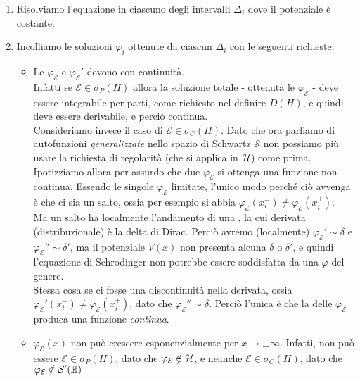\documentclass[../../FisicaTeorica.tex]{subfiles}
\begin{document}
\begin{enumerate}
\item Risolviamo l'equazione in ciascuno degli intervalli $\Delta_i$ dove il potenziale è costante.
\item Incolliamo le soluzioni $\varphi_i$ ottenute da ciascun $\Delta_i$ con le seguenti richieste:
\begin{itemize}
\item Le $\varphi_\mathcal{E}$ e $\varphi_{\mathcal{E}}'$ devono  con continuità.\\ Infatti se $\mathcal{E}\in \sigma_P(H)$ allora la soluzione totale - ottenuta  le $\varphi_\mathcal{E}$ - deve essere 
integrabile per parti, come richiesto nel definire $D(H)$, e quindi deve essere derivabile, e perciò continua.\\
Consideriamo invece il caso di $\mathcal{E}\in \sigma_C(H)$. Dato che ora parliamo di autofunzioni \textit{generalizzate} nello spazio di Schwartz $\mathcal{S}$ non possiamo più usare la richiesta di regolarità (che si applica in $\mathcal{H}$) come prima. Ipotizziamo allora per assurdo che  due $\varphi_\mathcal{E}$ si ottenga una funzione non continua. Essendo le singole $\varphi_\mathcal{E}$ limitate, l'unico modo perché ciò avvenga è che ci sia un salto, ossia per esempio si abbia $\varphi_{\mathcal{E}}(x_i^-)\neq \varphi_{\mathcal{E}}(x_i^+)$.\\
Ma un salto ha localmente l'andamento di una , la cui derivata (distribuzionale) è la delta di Dirac. Perciò avremo (localmente) $\varphi_{\mathcal{E}}'\sim \delta$ e $\varphi_{\mathcal{E}}''\sim \delta'$, ma il potenziale $V(x)$ non presenta alcuna $\delta$ o $\delta'$, e quindi l'equazione di Schrodinger non potrebbe essere soddisfatta da una $\varphi$ del genere.\\
Stessa cosa se ci fosse una discontinuità nella derivata, ossia $\varphi_\mathcal{E}'(x_i^-)\neq \varphi_\mathcal{E}(x_i^+)$, dato che $\varphi_{\mathcal{E}}''\sim\delta$. Perciò l'unica è che la  delle $\varphi_\mathcal{E}$ produca una funzione \textit{continua}.
\item $\varphi_{\mathcal{E}}(x)$ non può crescere esponenzialmente per $x\to\pm \infty$. Infatti, non può essere $\mathcal{E}\in \sigma_P(H)$, dato che $\varphi_{\mathcal{E}}\notin \mathcal{H}$, e neanche $\mathcal{E}\in \sigma_C(H)$, dato che $\varphi_\mathcal{E}\notin \mathcal{S}'(\mathbb{R})$
\end{itemize} 
\end{enumerate}
\end{document}
